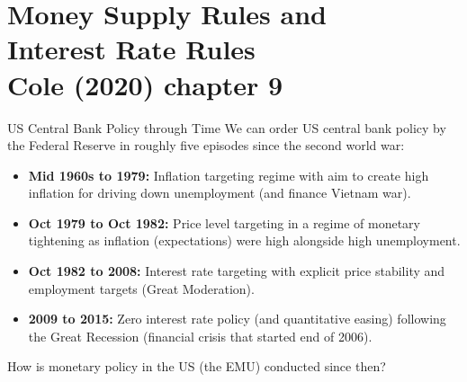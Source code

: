 \documentclass[10pt,c,aspectratio=1610,handout]{beamer}
\begin{document}
\section{Money Supply Rules and\\Interest Rate Rules\\{\small Cole (2020) chapter 9}}%
\begin{frame}{US Central Bank Policy through Time}%
  We can order US central bank policy by the Federal Reserve in roughly five episodes since the second world war:%
  \begin{itemize}%
    \item[$\blacktriangleright$] \textbf{Mid 1960s to 1979:} Inflation targeting regime with aim to create high inflation for driving down unemployment (and finance Vietnam war).%
    \item[$\blacktriangleright$] \textbf{Oct 1979 to Oct 1982:} Price level targeting in a regime of monetary tightening as inflation (expectations) were high alongside high unemployment.%
    \item[$\blacktriangleright$] \textbf{Oct 1982 to 2008:} Interest rate targeting with explicit price stability and employment targets (Great Moderation).%
    \item[$\blacktriangleright$] \textbf{2009 to 2015:} Zero interest rate policy (and quantitative easing) following the Great Recession (financial crisis that started end of 2006).%
  \end{itemize}%
  \pause%
  \vspace{0.1in}%
  \begin{center}%
    How is monetary policy in the US (the EMU) conducted since then?%
  \end{center}%
\end{frame}%
\end{document}
